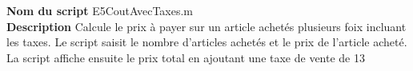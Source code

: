 \textbf{Nom du script}
E5CoutAvecTaxes.m\\
\textbf{Description}
Calcule le prix à payer sur un article achetés plusieurs foix incluant les taxes. Le script saisit le nombre d'articles achetés et le prix de l'article acheté. La script affiche ensuite le prix total en ajoutant une taxe de vente de 13%